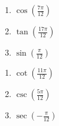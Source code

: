 \documentclass{ximera}
\begin{document}
\begin{multicols}{3}

\begin{enumerate}

\setcounter{enumi}{\value{HW}}

\item \label{cos7pi12} $\cos \left( \frac{7\pi}{12} \right)$
\item $\tan \left( \frac{17\pi}{12} \right)$
\item \label{sinpi12} $\sin \left( \frac{\pi}{12} \right)$ 

\setcounter{HW}{\value{enumi}}

\end{enumerate}

\end{multicols}

\begin{multicols}{3}

\begin{enumerate}

\setcounter{enumi}{\value{HW}}

\item $\cot \left( \frac{11\pi}{12} \right)$
\item $\csc \left( \frac{5\pi}{12} \right)$
\item $\sec \left( -\frac{\pi}{12} \right)$  \label{sumdifflast}

\setcounter{HW}{\value{enumi}}

\end{enumerate}

\end{multicols}
\end{document}
